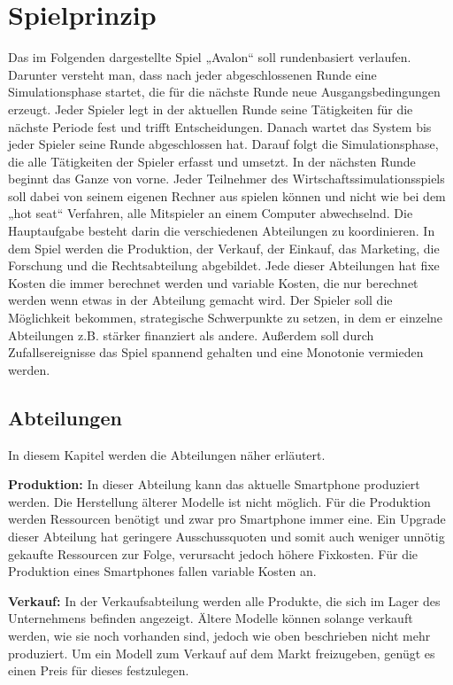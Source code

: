 \chapter{Spielprinzip}
Das im Folgenden dargestellte Spiel „Avalon“ soll rundenbasiert verlaufen. Darunter versteht man, dass nach jeder abgeschlossenen Runde eine Simulationsphase startet, die für die nächste Runde neue Ausgangsbedingungen erzeugt. Jeder Spieler legt in der aktuellen Runde seine Tätigkeiten für die nächste Periode fest und trifft Entscheidungen. Danach wartet das System bis jeder Spieler seine Runde abgeschlossen hat. Darauf folgt die Simulationsphase, die alle Tätigkeiten der Spieler erfasst und umsetzt. In der nächsten Runde beginnt das Ganze von vorne. Jeder Teilnehmer des Wirtschaftssimulationsspiels soll dabei von seinem eigenen Rechner aus spielen können und nicht wie bei dem „hot seat“ Verfahren, alle Mitspieler an einem Computer abwechselnd. Die Hauptaufgabe besteht darin die verschiedenen Abteilungen zu koordinieren. In dem Spiel werden die Produktion, der Verkauf, der Einkauf, das Marketing, die Forschung und die Rechtsabteilung abgebildet. Jede dieser Abteilungen hat fixe Kosten die immer berechnet werden und variable Kosten, die nur berechnet werden wenn etwas in der Abteilung gemacht wird. Der Spieler soll die Möglichkeit bekommen, strategische Schwerpunkte zu setzen, in dem er einzelne Abteilungen z.B. stärker finanziert als andere. Außerdem soll durch Zufallsereignisse das Spiel spannend gehalten und eine Monotonie vermieden werden.

\section{Abteilungen}
In diesem Kapitel werden die Abteilungen näher erläutert.

\textbf{Produktion: }
In dieser Abteilung kann das aktuelle Smartphone produziert werden. Die Herstellung älterer Modelle ist nicht möglich. Für die Produktion  werden Ressourcen benötigt und zwar pro Smartphone immer eine. Ein Upgrade dieser Abteilung hat geringere Ausschussquoten  und somit auch weniger unnötig gekaufte Ressourcen zur Folge, verursacht jedoch höhere Fixkosten. Für die Produktion eines Smartphones fallen variable Kosten an.

\textbf{Verkauf:} 
In der Verkaufsabteilung werden alle Produkte, die sich im Lager des Unternehmens befinden angezeigt. Ältere Modelle können solange verkauft werden, wie sie noch vorhanden sind, jedoch wie oben beschrieben nicht mehr produziert. Um ein Modell zum Verkauf auf dem Markt freizugeben, genügt es einen Preis für dieses festzulegen.

